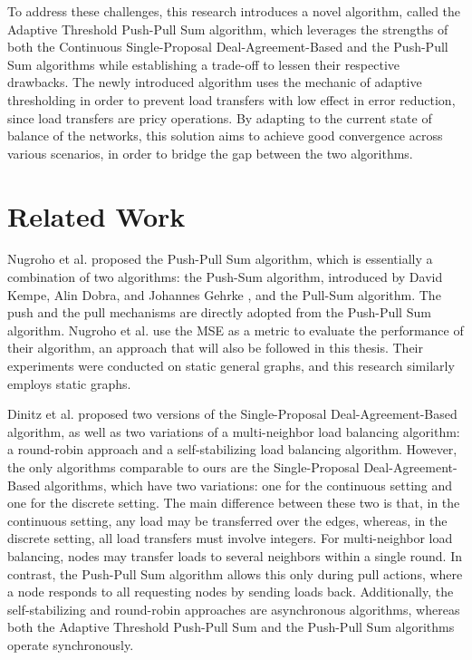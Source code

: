 To address these challenges, this research introduces a novel algorithm, called the Adaptive Threshold Push-Pull Sum algorithm, which leverages the strengths of both the Continuous Single-Proposal Deal-Agreement-Based and the Push-Pull Sum algorithms while establishing a trade-off to lessen their respective drawbacks. The newly introduced algorithm uses the mechanic of adaptive thresholding in order to prevent load transfers with low effect in error reduction, since load transfers are pricy operations. By adapting to the current state of balance of the networks, this solution aims to achieve good convergence across various scenarios, in order to bridge the gap between the two algorithms.

\section{Related Work}\label{sec:relatedwork}
Nugroho et al. \cite{nugroho2023PushPullSumDataAg} proposed the Push-Pull Sum algorithm, which is essentially a combination of two algorithms: the Push-Sum algorithm, introduced by David Kempe, Alin Dobra, and Johannes Gehrke \cite{kempe2003gossipbasedComp}, and the Pull-Sum algorithm. The push and the pull mechanisms are directly adopted from the Push-Pull Sum algorithm. Nugroho et al. use the MSE as a metric to evaluate the performance of their algorithm, an approach that will also be followed in this thesis. Their experiments were conducted on static general graphs, and this research similarly employs static graphs.

Dinitz et al. \cite{Dinitz2023DAB} proposed two versions of the Single-Proposal Deal-Agreement-Based algorithm, as well as two variations of a multi-neighbor load balancing algorithm: a round-robin approach and a self-stabilizing load balancing algorithm. However, the only algorithms comparable to ours are the Single-Proposal Deal-Agreement-Based algorithms, which have two variations: one for the continuous setting and one for the discrete setting. The main difference between these two is that, in the continuous setting, any load may be transferred over the edges, whereas, in the discrete setting, all load transfers must involve integers. For multi-neighbor load balancing, nodes may transfer loads to several neighbors within a single round. In contrast, the Push-Pull Sum algorithm allows this only during pull actions, where a node responds to all requesting nodes by sending loads back. Additionally, the self-stabilizing and round-robin approaches are asynchronous algorithms, whereas both the Adaptive Threshold Push-Pull Sum and the Push-Pull Sum algorithms operate synchronously.

